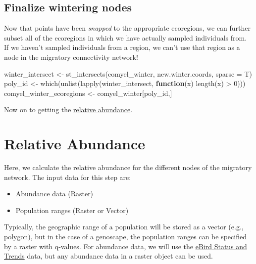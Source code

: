 \documentclass[
]{book}
\newenvironment{Shaded}{\begin{snugshade}}{\end{snugshade}}
\newcommand{\AttributeTok}[1]{\textcolor[rgb]{0.77,0.63,0.00}{#1}}
\newcommand{\ControlFlowTok}[1]{\textcolor[rgb]{0.13,0.29,0.53}{\textbf{#1}}}
\newcommand{\DecValTok}[1]{\textcolor[rgb]{0.00,0.00,0.81}{#1}}
\newcommand{\FunctionTok}[1]{\textcolor[rgb]{0.00,0.00,0.00}{#1}}
\newcommand{\NormalTok}[1]{#1}
\newcommand{\OtherTok}[1]{\textcolor[rgb]{0.56,0.35,0.01}{#1}}
\newcommand{\SpecialCharTok}[1]{\textcolor[rgb]{0.00,0.00,0.00}{#1}}
\providecommand{\tightlist}{%
  \setlength{\itemsep}{0pt}\setlength{\parskip}{0pt}}
\begin{document}
\hypertarget{finalize-wintering-nodes}{%
\section{Finalize wintering nodes}\label{finalize-wintering-nodes}}

Now that points have been \emph{snapped} to the appropriate ecoregions, we can further subset all of the ecoregions in which we have actually sampled individuals from. If we haven't sampled individuals from a region, we can't use that region as a node in the migratory connectivity network!

\begin{Shaded}
\begin{Highlighting}[]
\NormalTok{winter\_intersect }\OtherTok{\textless{}{-}} \FunctionTok{st\_intersects}\NormalTok{(comyel\_winter, new.winter.coords, }\AttributeTok{sparse =}\NormalTok{ T)}
\NormalTok{poly\_id }\OtherTok{\textless{}{-}} \FunctionTok{which}\NormalTok{(}\FunctionTok{unlist}\NormalTok{(}\FunctionTok{lapply}\NormalTok{(winter\_intersect, }\ControlFlowTok{function}\NormalTok{(x) }\FunctionTok{length}\NormalTok{(x) }\SpecialCharTok{\textgreater{}} \DecValTok{0}\NormalTok{)))}
\NormalTok{comyel\_winter\_ecoregions }\OtherTok{\textless{}{-}}\NormalTok{ comyel\_winter[poly\_id,]}
\end{Highlighting}
\end{Shaded}

Now on to getting the \protect\hyperlink{abundance}{relative abundance}.

\hypertarget{abundance}{%
\chapter{Relative Abundance}\label{abundance}}

Here, we calculate the relative abundance for the different nodes of the migratory network. The input data for this step are:

\begin{itemize}
\tightlist
\item
  Abundance data (Raster)
\item
  Population ranges (Raster or Vector)
\end{itemize}

Typically, the geographic range of a population will be stored as a vector (e.g., polygon), but in the case of a genoscape, the population ranges can be specified by a raster with q-values. For abundance data, we will use the \href{https://science.ebird.org/en/status-and-trends}{eBird Status and Trends} data, but any abundance data in a raster object can be used.
\end{document}
